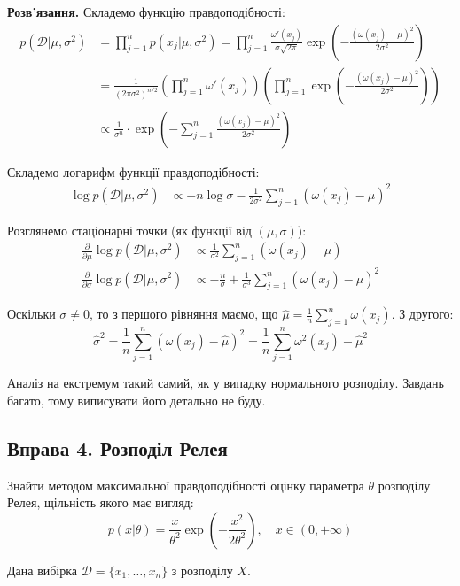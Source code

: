 \documentclass{hw_template}
\begin{document}
\textbf{Розв'язання.} Складемо функцію правдоподібності:
\begin{align*}
    p(\mathcal{D} | \mu,\sigma^2) &= \prod_{j=1}^n p(x_j | \mu,\sigma^2) = \prod_{j=1}^n \frac{\omega'(x_j)}{\sigma\sqrt{2\pi}}\exp\left(-\frac{(\omega(x_j)-\mu)^2}{2\sigma^2}\right) \\
    & = \frac{1}{(2\pi\sigma^2)^{n/2}}\left(\prod_{j=1}^n \omega'(x_j)\right)\left(\prod_{j=1}^n \exp\left(-\frac{(\omega(x_j)-\mu)^2}{2\sigma^2}\right) \right) \\
    & \propto \frac{1}{\sigma^n} \cdot \exp \left(-\sum_{j=1}^n \frac{(\omega(x_j)-\mu)^2}{2\sigma^2}\right)
\end{align*}

Складемо логарифм функції правдоподібності:
\begin{align*}
    \log p(\mathcal{D} | \mu,\sigma^2) &\propto -n\log\sigma - \frac{1}{2\sigma^2}\sum_{j=1}^n (\omega(x_j) - \mu)^2
\end{align*}

Розглянемо стаціонарні точки (як функції від $(\mu,\sigma)$):
\begin{align*}
    \frac{\partial}{\partial \mu} \log p(\mathcal{D} | \mu,\sigma^2) &\propto \frac{1}{\sigma^2}\sum_{j=1}^n (\omega(x_j) - \mu) \\
    \frac{\partial}{\partial \sigma} \log p(\mathcal{D} | \mu,\sigma^2) &\propto -\frac{n}{\sigma} + \frac{1}{\sigma^3}\sum_{j=1}^n (\omega(x_j) - \mu)^2
\end{align*}

Оскільки $\sigma \neq 0$, то з першого рівняння маємо, що $\hat{\mu} = \frac{1}{n}\sum_{j=1}^n \omega(x_j)$. З другого:
\begin{equation*}
    \hat{\sigma}^2 = \frac{1}{n}\sum_{j=1}^n (\omega(x_j) - \hat{\mu})^2 = \frac{1}{n}\sum_{j=1}^n \omega^2(x_j) - \hat{\mu}^2
\end{equation*}

Аналіз на екстремум такий самий, як у випадку нормального розподілу. Завдань багато, тому виписувати його детально не буду.

\pagebreak

\subsection{Вправа 4. Розподіл Релея}

\begin{problem}
    Знайти методом максимальної правдоподібності оцінку параметра $\theta$ розподілу Релея, щільність якого має вигляд:
    \begin{equation*}
        p(x|\theta) = \frac{x}{\theta^2}\exp\left(-\frac{x^2}{2\theta^2}\right), \quad x \in (0,+\infty)
    \end{equation*}

    Дана вибірка $\mathcal{D} = \{x_1,\dots,x_n\}$ з розподілу $X$.
\end{problem}
\end{document}
